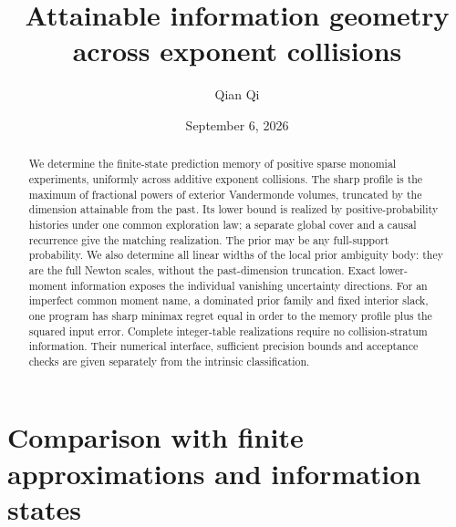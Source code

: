 \documentclass[11pt]{amsart}
\title[Attainable information geometry]{Attainable information geometry\\ across exponent collisions}
\author{Qian Qi}
\date{September 6, 2026}
\theoremstyle{definition}\newtheorem{definition}[theorem]{Definition}
\theoremstyle{remark}\newtheorem{remark}[theorem]{Remark}
\begin{document}
\begin{abstract}
We determine the finite-state prediction memory of positive sparse
monomial experiments, uniformly across additive exponent collisions.
The sharp profile is the maximum of fractional powers of exterior
Vandermonde volumes, truncated by the dimension attainable from the past.
Its lower bound is realized by positive-probability histories under one
common exploration law; a separate global cover and a causal recurrence
give the matching realization. The prior may be any full-support
probability. We also determine all linear widths of the local prior
ambiguity body: they are the full Newton scales, without the past-dimension
truncation. Exact lower-moment information exposes the individual
vanishing uncertainty directions. For an imperfect common moment name,
a dominated prior family and fixed interior slack, one program has
sharp minimax regret equal in order to the memory profile plus the
squared input error. Complete integer-table realizations require no
collision-stratum information. Their numerical interface, sufficient
precision bounds and acceptance checks are given separately from the
intrinsic classification.
\end{abstract}
\maketitle










\appendix












\section{Comparison with finite approximations and information states}
\label{sec:literature-comparison}


\end{document}
